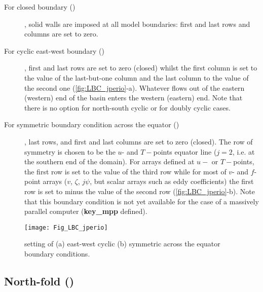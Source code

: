 \documentclass[../tex_main/NEMO_manual]{subfiles}
\begin{document}
\begin{description}

\item[For closed boundary ()], solid walls are imposed at all model 
boundaries: first and last rows and columns are set to zero.

\item[For cyclic east-west boundary ()], first and last rows are set 
to zero (closed) whilst the first column is set to the value of the last-but-one column 
and the last column to the value of the second one (\autoref{fig:LBC_jperio}-a). 
Whatever flows out of the eastern (western) end of the basin enters the western 
(eastern) end. Note that there is no option for north-south cyclic or for doubly 
cyclic cases.

\item[For symmetric boundary condition across the equator ()], 
last rows, and first and last columns are set to zero (closed). The row of symmetry 
is chosen to be the $u$- and $T-$points equator line ($j=2$, i.e. at the southern 
end of the domain). For arrays defined at $u-$ or $T-$points, the first row is set 
to the value of the third row while for most of $v$- and $f$-point arrays ($v$, $\zeta$, 
$j\psi$, but  scalar arrays such as eddy coefficients) 
the first row is set to minus the value of the second row (\autoref{fig:LBC_jperio}-b). 
Note that this boundary condition is not yet available for the case of a massively 
parallel computer (\textbf{key{\_}mpp} defined).

\end{description}

\begin{figure}[!t]     \begin{center}
\texttt{[image: Fig\_LBC\_jperio]}
\caption{    \protect\label{fig:LBC_jperio}
setting of (a) east-west cyclic  (b) symmetric across the equator boundary conditions.}
\end{center}   \end{figure}

\subsection{North-fold (\protect{})}
\label{subsec:LBC_north_fold}
\end{document}
